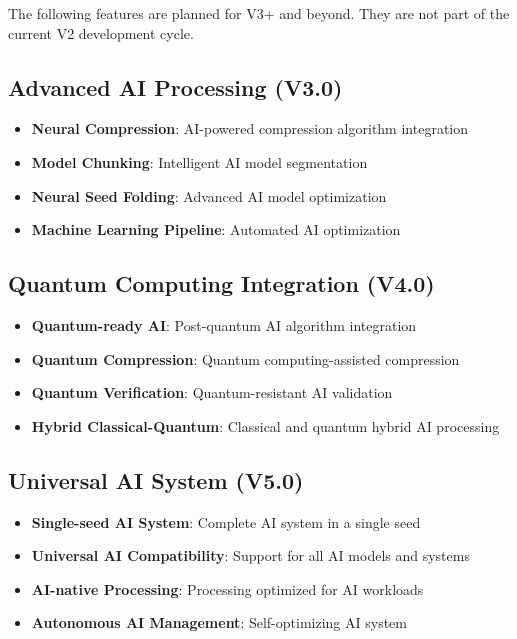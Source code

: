 \documentclass[12pt,a4paper]{article}
\begin{document}
\begin{tcolorbox}[colback=v3green!10,colframe=v3green!50,title=\textbf{Not Yet in V2 - Future Roadmap}]
The following features are planned for V3+ and beyond. They are not part of the current V2 development cycle.
\end{tcolorbox}

\subsection{Advanced AI Processing (V3.0)}
\begin{itemize}
    \item \textbf{Neural Compression}: AI-powered compression algorithm integration
    \item \textbf{Model Chunking}: Intelligent AI model segmentation
    \item \textbf{Neural Seed Folding}: Advanced AI model optimization
    \item \textbf{Machine Learning Pipeline}: Automated AI optimization
\end{itemize}

\subsection{Quantum Computing Integration (V4.0)}
\begin{itemize}
    \item \textbf{Quantum-ready AI}: Post-quantum AI algorithm integration
    \item \textbf{Quantum Compression}: Quantum computing-assisted compression
    \item \textbf{Quantum Verification}: Quantum-resistant AI validation
    \item \textbf{Hybrid Classical-Quantum}: Classical and quantum hybrid AI processing
\end{itemize}

\subsection{Universal AI System (V5.0)}
\begin{itemize}
    \item \textbf{Single-seed AI System}: Complete AI system in a single seed
    \item \textbf{Universal AI Compatibility}: Support for all AI models and systems
    \item \textbf{AI-native Processing}: Processing optimized for AI workloads
    \item \textbf{Autonomous AI Management}: Self-optimizing AI system
\end{itemize}
\end{document}
